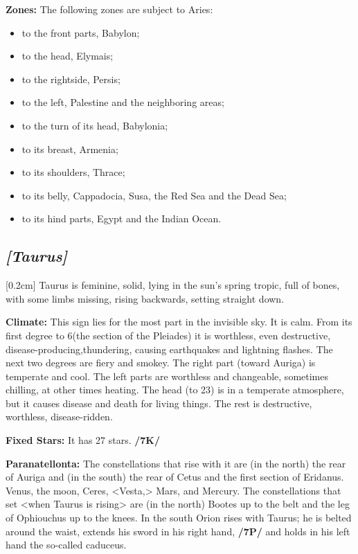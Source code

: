 \textbf{Zones:} The following zones are subject to Aries: 
\begin{itemize}
\item to the front parts, Babylon; 
\item to the head, Elymais; 
\item to the rightside, Persis; 
\item to the left, Palestine and the neighboring areas; 
\item to the turn of its head, Babylonia; 
\item to its breast, Armenia; 
\item to its shoulders, Thrace; 
\item to its belly, Cappadocia, Susa, the Red Sea and the Dead Sea; 
\item to its hind parts, Egypt and the Indian Ocean.
\end{itemize}

\secbr
\subsection{\textit{[Taurus]}}
[0.2cm]
 Taurus is  feminine,  solid, lying in the sun’s spring tropic, full of bones, with some limbs missing, rising backwards, setting straight down. 

\textbf{Climate:} This sign lies for the most part in the invisible sky. It is calm. From its first degree to 6\deg (the section of the Pleiades) it is worthless, even destructive, disease-producing,thundering, causing earthquakes and lightning flashes. The next two degrees are fiery and smokey. The right part (toward Auriga) is temperate and cool. The left parts are worthless and changeable, sometimes chilling, at other times heating. The head (to 23\deg) is in a temperate atmosphere, but it causes disease and death for living things. The rest is destructive, worthless, disease-ridden.

\textbf{Fixed Stars:} It has 27 stars. \textbf{/7K/}

\textbf{Paranatellonta:} The constellations that rise with it are (in the north) the rear of Auriga and (in the south) the rear of Cetus and the first section of Eridanus. Venus, the moon, Ceres, <Vesta,> Mars, and Mercury. The constellations that set <when Taurus is rising> are (in the north) Bootes up to the belt and the leg of Ophiouchus up to the knees. In the south Orion rises with Taurus; he is belted around the waist,
extends his sword in his right hand, \textbf{/7P/} and holds in his left hand the so-called caduceus.

